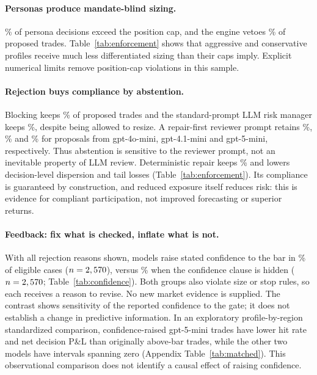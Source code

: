 \documentclass[letterpaper]{article} %
\begin{document}
\paragraph{Personas produce mandate-blind sizing.} \PersonaViol\% of persona decisions exceed the position cap, and the engine vetoes \VetoRate\% of proposed trades. Table~\ref{tab:enforcement} shows that aggressive and conservative profiles receive much less differentiated sizing than their caps imply. Explicit numerical limits remove position-cap violations in this sample.

\paragraph{Rejection buys compliance by abstention.} Blocking keeps \KeptBlock\% of proposed trades and the standard-prompt LLM risk manager keeps \KeptAgent\%, despite being allowed to resize. A repair-first reviewer prompt retains \RiskMgrKeptRepairFirstFourO\%, \RiskMgrKeptRepairFirstFourOne\% and \RiskMgrKeptRepairFirstFive\% for proposals from gpt-4o-mini, gpt-4.1-mini and gpt-5-mini, respectively. Thus abstention is sensitive to the reviewer prompt, not an inevitable property of LLM review. Deterministic repair keeps \KeptRepair\% and lowers decision-level dispersion and tail losses (Table~\ref{tab:enforcement}). Its compliance is guaranteed by construction, and reduced exposure itself reduces risk: this is evidence for compliant participation, not improved forecasting or superior returns.

\begin{table}[t]
\centering
\footnotesize
\setlength{\tabcolsep}{3pt}

\caption{Feedback on proposals vetoed for low confidence \emph{and} for size or stop. ``Bar shown'': the feedback lists every violated clause. ``Bar hidden'': the same feedback without the confidence clause, which the engine still enforces. No new evidence is given in either arm. Brackets: 95\% Wilson intervals.}
\label{tab:confidence}
\end{table}

\paragraph{Feedback: fix what is checked, inflate what is not.} With all rejection reasons shown, models raise stated confidence to the bar in \ConfRaisedShown\% of eligible cases ($n=2,570$), versus \ConfRaisedHidden\% when the confidence clause is hidden ($n=2,570$; Table~\ref{tab:confidence}). Both groups also violate size or stop rules, so each receives a reason to revise. No new market evidence is supplied. The contrast shows sensitivity of the reported confidence to the gate; it does not establish a change in predictive information. In an exploratory profile-by-region standardized comparison, confidence-raised gpt-5-mini trades have lower hit rate and net decision P\&L than originally above-bar trades, while the other two models have intervals spanning zero (Appendix Table~\ref{tab:matched}). This observational comparison does not identify a causal effect of raising confidence.
\end{document}
